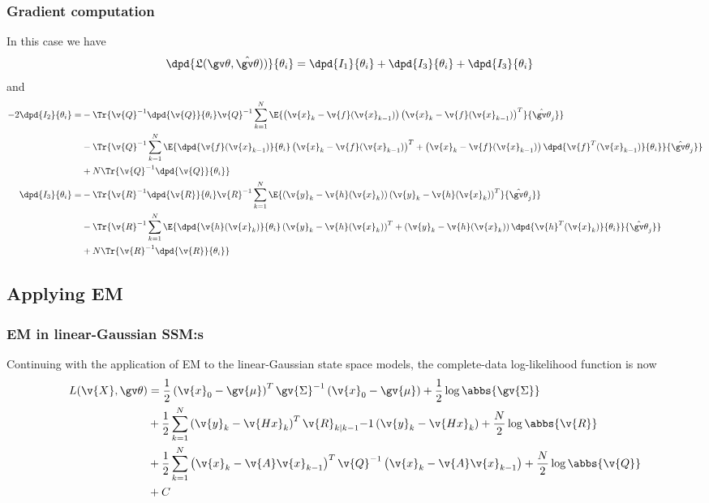 \subsubsection{Gradient computation}
In this case we have
\begin{align}
	\dpd{\Lb(\Th,\hat{\Th}))}{\theta_i}&=\dpd{I_1}{\theta_i}+\dpd{I_3}{\theta_i}+\dpd{I_3}{\theta_i}
	\label{eq:dLB_nonlinear_1}
\end{align}
and
\begin{align}
\begin{split}
	-2\dpd{I_2}{\theta_i}
	=&-\Tr{\v{Q}^{-1}\dpd{\v{Q}}{\theta_i}\v{Q}^{-1}
	\sum_{k=1}^N\E{\left(\v{x}_k-\v{f}(\v{x}_{k-1})\right)\left(\v{x}_k-\v{f}(\v{x}_{k-1})\right)^T}{\hat{\Th}_j}}\\
	&-\Tr{\v{Q}^{-1}\sum_{k=1}^N\E{\dpd{\v{f}(\v{x}_{k-1})}{\theta_i}\left(\v{x}_k-\v{f}(\v{x}_{k-1})\right)^T+\left(\v{x}_k-\v{f}(\v{x}_{k-1})\right)\dpd{\v{f}^T(\v{x}_{k-1})}{\theta_i}}{\hat{\Th}_j}}\\
	&+N\Tr{\v{Q}^{-1}\dpd{\v{Q}}{\theta_i}}\\
	\dpd{I_3}{\theta_i}=&
	-\Tr{\v{R}^{-1}\dpd{\v{R}}{\theta_i}\v{R}^{-1}
	\sum_{k=1}^N\E{\left(\v{y}_k-\v{h}(\v{x}_{k})\right)\left(\v{y}_k-\v{h}(\v{x}_{k})\right)^T}{\hat{\Th}_j}}\\
	&-\Tr{\v{R}^{-1}\sum_{k=1}^N\E{\dpd{\v{h}(\v{x}_{k})}{\theta_i}\left(\v{y}_k-\v{h}(\v{x}_{k})\right)^T+\left(\v{y}_k-\v{h}(\v{x}_{k})\right)\dpd{\v{h}^T(\v{x}_{k})}{\theta_i}}{\hat{\Th}_j}}\\
	&+N\Tr{\v{R}^{-1}\dpd{\v{R}}{\theta_i}}\\
	\label{eq:dLB_nonlinear}
\end{split}
\end{align}

\subsection{Applying EM}%

\subsubsection{EM in linear-Gaussian SSM:s}
\parencite{shumway1982approach,Ghahramani1996}
Continuing with the application of EM to the linear-Gaussian state space models, 
the complete-data log-likelihood function is now
\begin{align}
\label{eq:clLH}
\begin{split}
	L(\v{X},\Th)&=
	\frac{1}{2}\left(\v{x}_0-\gv{\mu}\right)^T\gv{\Sigma}^{-1}\left(\v{x}_0-\gv{\mu}\right)+\frac{1}{2}\log\abbs{\gv{\Sigma}}\\
	&+\frac{1}{2}\sum_{k=1}^N\left(\v{y}_k-\v{Hx}_k\right)^T\v{R}_{k|k-1}{-1}\left(\v{y}_k-\v{Hx}_k\right)+\frac{N}{2}\log\abbs{\v{R}}\\
	&+\frac{1}{2}\sum_{k=1}^N\left(\v{x}_k-\v{A}\v{x}_{k-1}\right)^T\v{Q}^{-1}\left(\v{x}_k-\v{A}\v{x}_{k-1}\right)+\frac{N}{2}\log\abbs{\v{Q}}\\
	&+C
\end{split}
\end{align}

